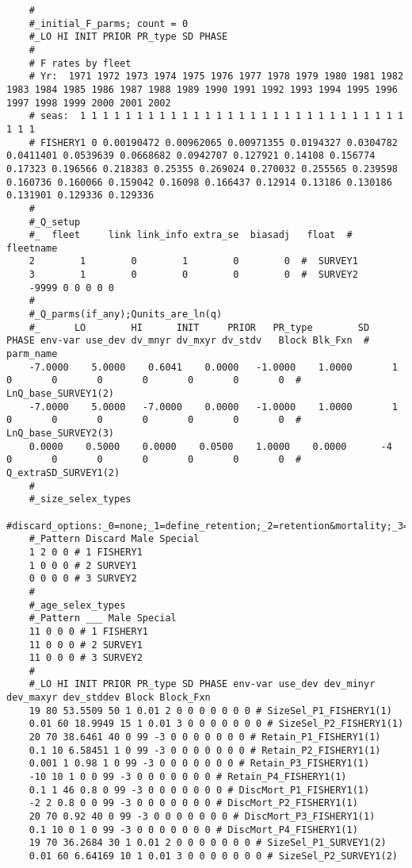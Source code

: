 \begin{landscape}
{\begin{verbatim}
	#
	#_initial_F_parms; count = 0
	#_LO HI INIT PRIOR PR_type SD PHASE
	#
	# F rates by fleet
	# Yr:  1971 1972 1973 1974 1975 1976 1977 1978 1979 1980 1981 1982 1983 1984 1985 1986 1987 1988 1989 1990 1991 1992 1993 1994 1995 1996 1997 1998 1999 2000 2001 2002
	# seas:  1 1 1 1 1 1 1 1 1 1 1 1 1 1 1 1 1 1 1 1 1 1 1 1 1 1 1 1 1 1 1 1
	# FISHERY1 0 0.00190472 0.00962065 0.00971355 0.0194327 0.0304782 0.0411401 0.0539639 0.0668682 0.0942707 0.127921 0.14108 0.156774 0.17323 0.196566 0.218383 0.25355 0.269024 0.270032 0.255565 0.239598 0.160736 0.160066 0.159042 0.16098 0.166437 0.12914 0.13186 0.130186 0.131901 0.129336 0.129336
	#
	#_Q_setup
	#_  fleet     link link_info extra_se  biasadj   float  #  fleetname
	2        1        0        1        0        0  #  SURVEY1
	3        1        0        0        0        0  #  SURVEY2
	-9999 0 0 0 0 0
	#
	#_Q_parms(if_any);Qunits_are_ln(q)
	#_      LO        HI      INIT     PRIOR   PR_type        SD   PHASE env-var use_dev dv_mnyr dv_mxyr dv_stdv   Block Blk_Fxn  #  parm_name
	-7.0000    5.0000    0.6041    0.0000   -1.0000    1.0000       1       0       0       0       0       0       0       0  #  LnQ_base_SURVEY1(2)
	-7.0000    5.0000   -7.0000    0.0000   -1.0000    1.0000       1       0       0       0       0       0       0       0  #  LnQ_base_SURVEY2(3)
	0.0000    0.5000    0.0000    0.0500    1.0000    0.0000      -4       0       0       0       0       0       0       0  #  Q_extraSD_SURVEY1(2)
	#
	#_size_selex_types
	#discard_options:_0=none;_1=define_retention;_2=retention&mortality;_3=all_discarded_dead
	#_Pattern Discard Male Special
	1 2 0 0 # 1 FISHERY1
	1 0 0 0 # 2 SURVEY1
	0 0 0 0 # 3 SURVEY2
	#
	#_age_selex_types
	#_Pattern ___ Male Special
	11 0 0 0 # 1 FISHERY1
	11 0 0 0 # 2 SURVEY1
	11 0 0 0 # 3 SURVEY2
	#
	#_LO HI INIT PRIOR PR_type SD PHASE env-var use_dev dev_minyr dev_maxyr dev_stddev Block Block_Fxn
	19 80 53.5509 50 1 0.01 2 0 0 0 0 0 0 0 # SizeSel_P1_FISHERY1(1)
	0.01 60 18.9949 15 1 0.01 3 0 0 0 0 0 0 0 # SizeSel_P2_FISHERY1(1)
	20 70 38.6461 40 0 99 -3 0 0 0 0 0 0 0 # Retain_P1_FISHERY1(1)
	0.1 10 6.58451 1 0 99 -3 0 0 0 0 0 0 0 # Retain_P2_FISHERY1(1)
	0.001 1 0.98 1 0 99 -3 0 0 0 0 0 0 0 # Retain_P3_FISHERY1(1)
	-10 10 1 0 0 99 -3 0 0 0 0 0 0 0 # Retain_P4_FISHERY1(1)
	0.1 1 46 0.8 0 99 -3 0 0 0 0 0 0 0 # DiscMort_P1_FISHERY1(1)
	-2 2 0.8 0 0 99 -3 0 0 0 0 0 0 0 # DiscMort_P2_FISHERY1(1)
	20 70 0.92 40 0 99 -3 0 0 0 0 0 0 0 # DiscMort_P3_FISHERY1(1)
	0.1 10 0 1 0 99 -3 0 0 0 0 0 0 0 # DiscMort_P4_FISHERY1(1)
	19 70 36.2684 30 1 0.01 2 0 0 0 0 0 0 0 # SizeSel_P1_SURVEY1(2)
	0.01 60 6.64169 10 1 0.01 3 0 0 0 0 0 0 0 # SizeSel_P2_SURVEY1(2)

\end{verbatim}}
\end{landscape}
